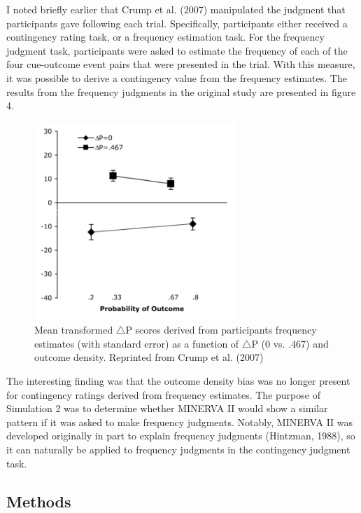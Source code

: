 \documentclass[
  english,
  man,floatsintext]{apa6}
\begin{document}
I noted briefly earlier that Crump et al. (2007) manipulated the judgment that participants gave following each trial. Specifically, participants either received a contingency rating task, or a frequency estimation task. For the frequency judgment task, participants were asked to estimate the frequency of each of the four cue-outcome event pairs that were presented in the trial. With this measure, it was possible to derive a contingency value from the frequency estimates. The results from the frequency judgments in the original study are presented in figure 4.

\begin{figure}

{\centering \includegraphics[width=3in]{imgs/crump_frequency_results} 

}

\caption{Mean transformed $\triangle$P scores derived from participants frequency estimates (with standard error) as a function of $\triangle$P (0 vs. .467) and outcome density. Reprinted from Crump et al. (2007)}\label{fig:unnamed-chunk-6}
\end{figure}

The interesting finding was that the outcome density bias was no longer present for contingency ratings derived from frequency estimates. The purpose of Simulation 2 was to determine whether MINERVA II would show a similar pattern if it was asked to make frequency judgments. Notably, MINERVA II was developed originally in part to explain frequency judgments (Hintzman, 1988), so it can naturally be applied to frequency judgments in the contingency judgment task.

\hypertarget{methods-1}{%
\subsection{Methods}\label{methods-1}}
\end{document}
